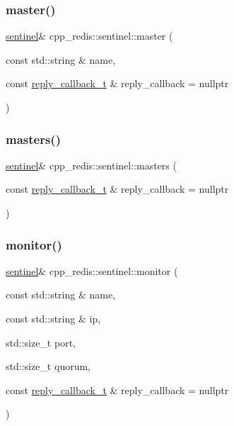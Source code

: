 \subsubsection{\texorpdfstring{master()}{master()}}
{\footnotesize\ttfamily \hyperlink{classcpp__redis_1_1sentinel}{sentinel}\& cpp\+\_\+redis\+::sentinel\+::master (\begin{DoxyParamCaption}\item[{const std\+::string \&}]{name,  }\item[{const \hyperlink{classcpp__redis_1_1sentinel_ae1a150ff8787208c47414397a061c9a7}{reply\+\_\+callback\+\_\+t} \&}]{reply\+\_\+callback = {\ttfamily nullptr} }\end{DoxyParamCaption})}

\mbox{\label{classcpp__redis_1_1sentinel_aed4cacf43432630eb2934ce8b8dec104}} 
\subsubsection{\texorpdfstring{masters()}{masters()}}
{\footnotesize\ttfamily \hyperlink{classcpp__redis_1_1sentinel}{sentinel}\& cpp\+\_\+redis\+::sentinel\+::masters (\begin{DoxyParamCaption}\item[{const \hyperlink{classcpp__redis_1_1sentinel_ae1a150ff8787208c47414397a061c9a7}{reply\+\_\+callback\+\_\+t} \&}]{reply\+\_\+callback = {\ttfamily nullptr} }\end{DoxyParamCaption})}

\mbox{\label{classcpp__redis_1_1sentinel_ad4ae72b60a5a03977cda0d3e1f4ee48d}} 
\subsubsection{\texorpdfstring{monitor()}{monitor()}}
{\footnotesize\ttfamily \hyperlink{classcpp__redis_1_1sentinel}{sentinel}\& cpp\+\_\+redis\+::sentinel\+::monitor (\begin{DoxyParamCaption}\item[{const std\+::string \&}]{name,  }\item[{const std\+::string \&}]{ip,  }\item[{std\+::size\+\_\+t}]{port,  }\item[{std\+::size\+\_\+t}]{quorum,  }\item[{const \hyperlink{classcpp__redis_1_1sentinel_ae1a150ff8787208c47414397a061c9a7}{reply\+\_\+callback\+\_\+t} \&}]{reply\+\_\+callback = {\ttfamily nullptr} }\end{DoxyParamCaption})}

